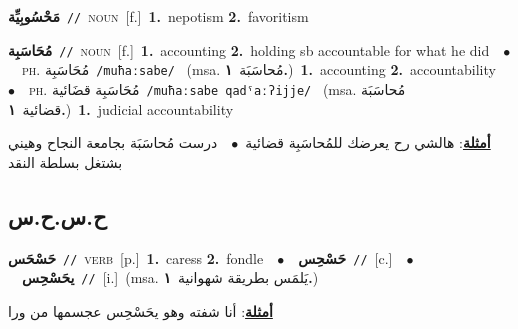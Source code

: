 \documentclass[10pt,a4paper,twoside]{article} %
\begin{document}
\begin{multicols}{2}
{\setlength\topsep{0pt}\textbf{\foreignlanguage{arabic}{مَحْسُوبِيِّة}}\ {\color{gray}\texttt{//}\color{black}}\ \textsc{noun}\ [f.]\ \textbf{1.}~nepotism  \textbf{2.}~favoritism\ } \vspace{2mm}

{\setlength\topsep{0pt}\textbf{\foreignlanguage{arabic}{مُحَاسَبِة}}\ {\color{gray}\texttt{//}\color{black}}\ \textsc{noun}\ [f.]\ \textbf{1.}~accounting  \textbf{2.}~holding sb accountable for what he did\ \ $\bullet$\ \ \textsc{ph.} \color{gray} \foreignlanguage{arabic}{مُحَاسَبِة}\color{black}\ {\color{gray}\texttt{/{\sffamily muħaːsabe}/}\color{black}}\ \color{gray} (msa. \foreignlanguage{arabic}{مُحاسَبَة}~\foreignlanguage{arabic}{\textbf{١.}})\color{black}\ \textbf{1.}~accounting  \textbf{2.}~accountability\ \ $\bullet$\ \ \textsc{ph.} \color{gray} \foreignlanguage{arabic}{مُحَاسَبِة قضَائية}\color{black}\ {\color{gray}\texttt{/{\sffamily muħaːsabe qadˤaːʔijje}/}\color{black}}\ \color{gray} (msa. \foreignlanguage{arabic}{مُحاسَبَة قضائية}~\foreignlanguage{arabic}{\textbf{١.}})\color{black}\ \textbf{1.}~judicial accountability\  \begin{flushright}\color{gray}\foreignlanguage{arabic}{\textbf{\underline{\foreignlanguage{arabic}{أمثلة}}}: هالشي رح يعرضك للمُحاسَبِة قضائية\ $\bullet$\ \  درست مُحاسَبَة بجامعة النجاح وهيني بشتغل بسلطة النقد}\end{flushright}\color{black}} \vspace{2mm}

\vspace{-3mm}
\subsection*{\color{blue}\foreignlanguage{arabic}{ح.س.ح.س}\color{blue}{}} 

{\setlength\topsep{0pt}\textbf{\foreignlanguage{arabic}{حَسْحَس}}\ {\color{gray}\texttt{//}\color{black}}\ \textsc{verb}\ [p.]\ \textbf{1.}~caress  \textbf{2.}~fondle\ \ $\bullet$\ \ \setlength\topsep{0pt}\textbf{\foreignlanguage{arabic}{حَسْحِس}}\ {\color{gray}\texttt{//}\color{black}}\ [c.]\ \ $\bullet$\ \ \setlength\topsep{0pt}\textbf{\foreignlanguage{arabic}{يحَسْحِس}}\ {\color{gray}\texttt{//}\color{black}}\ [i.]\ \color{gray}(msa. \foreignlanguage{arabic}{يَلمَس بطريقة شهوانية}~\foreignlanguage{arabic}{\textbf{١.}})\color{black}\  \begin{flushright}\color{gray}\foreignlanguage{arabic}{\textbf{\underline{\foreignlanguage{arabic}{أمثلة}}}: أنا شفته وهو يحَسْحِس عجسمها من ورا}\end{flushright}\color{black}} \vspace{2mm}


\end{multicols}
\end{document}
